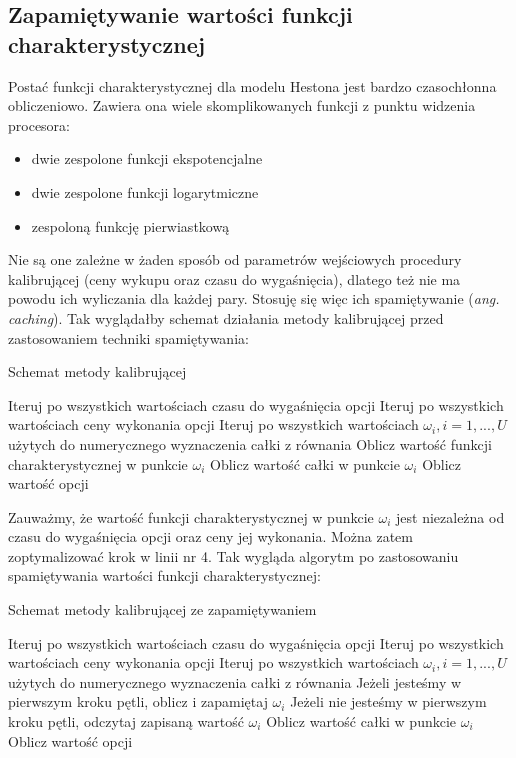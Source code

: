 \documentclass{pracamgr}
\begin{document}
\subsection{Zapamiętywanie wartości funkcji charakterystycznej}
Postać funkcji charakterystycznej dla modelu Hestona jest bardzo czasochłonna obliczeniowo. 
Zawiera ona wiele skomplikowanych funkcji z punktu widzenia procesora:
\begin{itemize}
  \item dwie zespolone funkcji ekspotencjalne
  \item dwie zespolone funkcji logarytmiczne
  \item zespoloną funkcję pierwiastkową
\end{itemize}
Nie są one zależne w żaden sposób od parametrów wejściowych procedury kalibrującej (ceny wykupu oraz 
czasu do wygaśnięcia), dlatego też nie ma powodu ich wyliczania dla każdej pary. 
Stosuję się więc ich spamiętywanie (\textit{ang. caching}).
Tak wyglądałby schemat działania metody kalibrującej \cite{AcceleratingHeston} przed zastosowaniem 
techniki spamiętywania:
\begin{algorithm}[H]
\caption{Schemat metody kalibrującej}\label{euclid}
\begin{algorithmic}[1]
  \State Iteruj po wszystkich wartościach czasu do wygaśnięcia opcji
  \State Iteruj po wszystkich wartościach ceny wykonania opcji
  \State Iteruj po wszystkich wartościach $\omega_i, i = 1, ..., U $ użytych do numerycznego wyznaczenia całki z równania   
  \State Oblicz wartość funkcji charakterystycznej w punkcie $\omega_i$
  \State Oblicz wartość całki w punkcie $\omega_i$
  \State Oblicz wartość opcji
\end{algorithmic}
\label{alg:simulatedAnnealing}
\end{algorithm}
Zauważmy, że wartość funkcji charakterystycznej w punkcie $\omega_i$ jest niezależna od czasu do 
wygaśnięcia opcji oraz ceny jej wykonania. Można zatem zoptymalizować krok w linii nr 4. Tak wygląda 
algorytm po zastosowaniu spamiętywania wartości funkcji charakterystycznej:

\begin{algorithm}[H]
\caption{Schemat metody kalibrującej ze zapamiętywaniem}\label{euclid}

\begin{algorithmic}[1]
  
  \State Iteruj po wszystkich wartościach czasu do wygaśnięcia opcji
  \State Iteruj po wszystkich wartościach ceny wykonania opcji
  \State Iteruj po wszystkich wartościach $\omega_i, i = 1, ..., U $ użytych do numerycznego wyznaczenia całki z równania   
  \State Jeżeli jesteśmy w pierwszym kroku pętli, oblicz i zapamiętaj $\omega_i$
  \State Jeżeli nie jesteśmy w pierwszym kroku pętli, odczytaj zapisaną wartość $\omega_i$
  \State Oblicz wartość całki w punkcie $\omega_i$
  \State Oblicz wartość opcji

\end{algorithmic}
\label{alg:simulatedAnnealing}
\end{algorithm}
\end{document}
